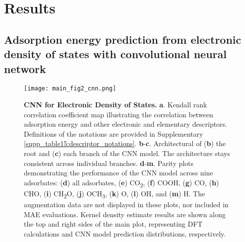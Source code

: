 
\section{Results}

\subsection{Adsorption energy prediction from electronic density of states with convolutional neural network}

\begin{figure}[htbp]
    \centering
    \texttt{[image: main\_fig2\_cnn.png]}
    \caption{\textbf{CNN for Electronic Density of States.}
    \textbf{a}. Kendall rank correlation coefficient map illustrating the correlation
    between adsorption energy and other electronic and elementary descriptors.
    Definitions of the notations are provided in
    Supplementary \cref{supp_table15:descriptor_notations}.
    \textbf{b}-\textbf{c}. Architectural of (\textbf{b}) the root and
    (\textbf{c}) each branch of the CNN model.
    The architecture stays consistent across individual branches.
    \textbf{d}-\textbf{m}. Parity plots demonstrating the performance of the
    CNN model across nine adsorbates:
    (\textbf{d}) all adsorbates, (\textbf{e}) CO\textsubscript{2}, (\textbf{f}) COOH,
    (\textbf{g}) CO, (\textbf{h}) CHO, (\textbf{i}) CH\textsubscript{2}O,
    (\textbf{j}) OCH\textsubscript{3}, (\textbf{k}) O, (\textbf{l}) OH, and (\textbf{m}) H.
    The augmentation data are not displayed in these plots, nor included in MAE evaluations.
    Kernel density estimate results are shown along the top and right sides of the main plot,
    representing DFT calculations and CNN model prediction distributions, respectively.}
    \label{main_fig2:cnn_for_eads}
\end{figure}

